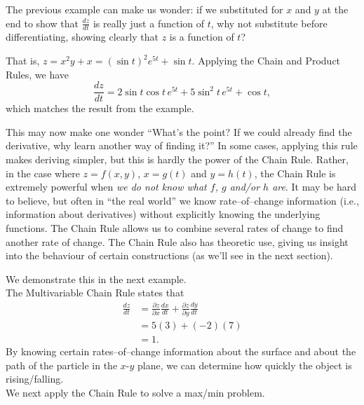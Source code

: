 The previous example can make us wonder: if we substituted for $x$ and $y$ at the end to show that $\frac{dz}{dt}$ is really just a function of $t$, why not substitute before differentiating, showing clearly that $z$ is a function of $t$?

That is, $z = x^2y+x = (\sin t)^2e^{5t}+\sin t.$ Applying the Chain and Product Rules, we have 
\[
\frac{dz}{dt} = 2\sin t\cos t\, e^{5t}+ 5\sin^2t\,e^{5t}+\cos t,
\]
which matches the result from the example.

This may now make one wonder ``What's the point? If we could already find the derivative, why learn another way of finding it?'' In some cases, applying this rule makes deriving simpler, but this is hardly the power of the Chain Rule. Rather, in the case where $z=f(x,y)$, $x=g(t)$ and $y=h(t)$, the Chain Rule is extremely powerful when \textit{we do not know what $f$, $g$ and/or $h$ are}. It may be hard to believe, but often in ``the real world'' we know rate--of--change information (i.e., information about derivatives) without explicitly knowing the underlying functions. The Chain Rule allows us to combine several rates of change to find another rate of change. The Chain Rule also has theoretic use, giving us insight into the behaviour of certain constructions (as we'll see in the next section).

We demonstrate this in the next example.\\

{The Multivariable Chain Rule states that 
\begin{align*}
\frac{dz}{dt} &= \frac{\partial z}{\partial x}\frac{dx}{dt} + \frac{\partial z}{\partial y}\frac{dy}{dt} \\
				&= 5(3)+(-2)(7) \\
				&=1.
\end{align*}
By knowing certain rates--of--change information about the surface and about the path of the particle in the $x$-$y$ plane, we can determine how quickly the object is rising/falling. 
}\\

We next apply the Chain Rule to solve a max/min problem.\\

